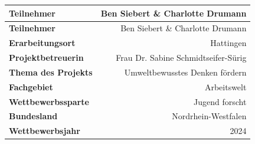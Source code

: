 \documentclass[./entry.tex]{subfiles}
\begin{document}
    \begin{center}
        \begin{tabular}{l|r}
            \hline
            \textbf{Teilnehmer} & Ben Siebert \& Charlotte Drumann \\
            \hline
            \textbf{Teilnehmer} & Ben Siebert \& Charlotte Drumann \\
            \hline
            \textbf{Erarbeitungsort} & Hattingen \\
            \hline
            \textbf{Projektbetreuerin} & Frau Dr. Sabine Schmidtseifer-Sürig \\
            \hline
            \textbf{Thema des Projekts} & Umweltbewusstes Denken fördern \\
            \hline
            \textbf{Fachgebiet} & Arbeitswelt \\
            \hline
            \textbf{Wettbewerbssparte} & Jugend forscht \\
            \hline
            \textbf{Bundesland} & Nordrhein-Westfalen \\
            \hline
            \textbf{Wettbewerbsjahr} & 2024 \\
            \hline
        \end{tabular}
    \end{center}
\end{document}
